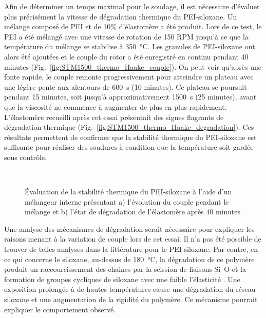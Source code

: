 Afin de déterminer un temps maximal pour le soudage, il est nécessaire d'évaluer plus précisément la vitesse de dégradation thermique du PEI-siloxane. 
Un mélange composé de PEI et de 10\% d'élastomère a été produit. 
Lors de ce test, le PEI a été mélangé avec une vitesse de rotation de 150 RPM jusqu'à ce que la température du mélange se stabilise à \SI[locale=FR]{350}{\celsius}. 
Les granules de PEI-siloxane ont alors été ajoutées et le couple du rotor a été enregistré en continu pendant 40 minutes (Fig.~\ref{fig:STM1500_thermo_Haake_couple}). 
On peut voir qu'après une fonte rapide, le couple remonte progressivement pour atteindre un plateau avec une légère pente aux alentours de \SI[locale=FR]{600}{\second} (10 minutes). 
Ce plateau se poursuit pendant 15 minutes, soit jusqu'à approximativement \SI[locale=FR]{1500}{\second} (25 minutes), avant que la viscosité ne commence à augmenter de plus en plus rapidement. 
L'élastomère recueilli après cet essai présentait des signes flagrants de dégradation thermique (Fig.~\ref{fig:STM1500_thermo_Haake_degradation}). 
Ces résultats permettent de confirmer que la stabilité thermique du PEI-siloxane est suffisante pour réaliser des soudures à condition que la température soit gardée sous contrôle. 

\begin{figure}[h]	
	\centering
	 \qquad
	 \\
	\caption{Évaluation de la stabilité thermique du PEI-siloxane à l'aide d'un mélangeur interne présentant a) l'évolution du couple pendant le mélange et b) l'état de dégradation de l'élastomère après 40 minutes}
	\label{fig:STM1500_thermo_Haake}
\end{figure}

Une analyse des mécanismes de dégradation serait nécessaire pour expliquer les raisons menant à la variation de couple lors de cet essai. 
Il n'a pas été possible de trouver de telles analyses dans la littérature pour le PEI-siloxane. 
Par contre, en ce qui concerne le siloxane, au-dessus de \SI{180}{\celsius}, la dégradation de ce polymère produit un raccourcissement des chaines par la scission de liaisons Si--O  et la formation de groupes cycliques de siloxane avec une faible l'élasticité \cite{Heinemann2004}. 
Une exposition prolongée à de hautes températures cause une dégradation du réseau siloxane et une augmentation de la rigidité du polymère. 
Ce mécanisme pourrait expliquer le comportement observé.  

